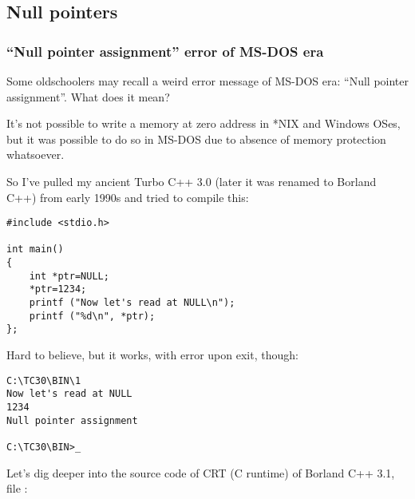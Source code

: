 \subsection{Null pointers}

\subsubsection{``Null pointer assignment'' error of MS-DOS era}

Some oldschoolers may recall a weird error message of MS-DOS era: ``Null pointer assignment''.
What does it mean?

It's not possible to write a memory at zero address in *NIX and Windows OSes, but it was possible to do so in MS-DOS due to absence of memory protection whatsoever.

So I've pulled my ancient Turbo C++ 3.0 (later it was renamed to Borland C++) from early 1990s and tried to compile this:

\begin{lstlisting}[style=customc]
#include <stdio.h>

int main()
{
	int *ptr=NULL;
	*ptr=1234;
	printf ("Now let's read at NULL\n");
	printf ("%d\n", *ptr);
};
\end{lstlisting}

Hard to believe, but it works, with error upon exit, though:

\begin{lstlisting}[caption=Ancient Turbo C 3.0]
C:\TC30\BIN\1
Now let's read at NULL
1234
Null pointer assignment

C:\TC30\BIN>_
\end{lstlisting}

Let's dig deeper into the source code of \ac{CRT} (C runtime) of Borland C++ 3.1, file :

